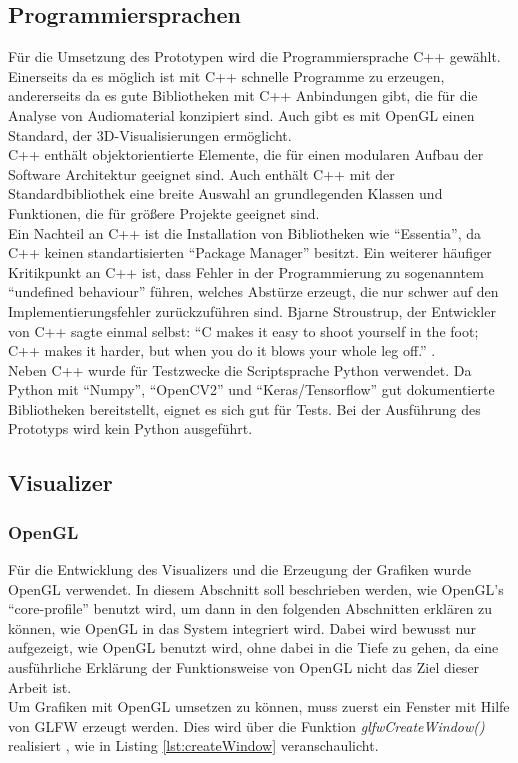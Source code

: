 \documentclass[11pt,a4paper]{article}
\begin{document}
\subsection{Programmiersprachen}
Für die Umsetzung des Prototypen wird die Programmiersprache C++ gewählt. Einerseits da es möglich ist mit C++ schnelle Programme zu erzeugen, andererseits da es gute Bibliotheken mit C++ Anbindungen gibt, die für die Analyse von Audiomaterial konzipiert sind. Auch gibt es mit OpenGL einen Standard, der 3D-Visualisierungen ermöglicht.\\
C++ enthält objektorientierte Elemente, die für einen modularen Aufbau der Software Architektur geeignet sind. Auch enthält C++ mit der Standardbibliothek eine breite Auswahl an grundlegenden Klassen und Funktionen, die für größere Projekte geeignet sind.\\
Ein Nachteil an C++ ist die Installation von Bibliotheken wie ``Essentia'', da C++ keinen standartisierten ``Package Manager'' besitzt. Ein weiterer häufiger Kritikpunkt an C++ ist, dass Fehler in der Programmierung zu sogenanntem ``undefined behaviour'' führen, welches Abstürze erzeugt, die nur schwer auf den Implementierungsfehler zurückzuführen sind. Bjarne Stroustrup, der Entwickler von C++ sagte einmal selbst: ``C makes it easy to shoot yourself in the foot; C++ makes it harder, but when you do it blows your whole leg off.'' \cite{BjarneStroustrupCite}.\\
Neben C++ wurde für Testzwecke die Scriptsprache Python verwendet. Da Python mit ``Numpy'', ``OpenCV2'' und ``Keras/Tensorflow'' gut dokumentierte Bibliotheken bereitstellt, eignet es sich gut für Tests. Bei der Ausführung des Prototyps wird kein Python ausgeführt.

\subsection{Visualizer}

\subsubsection{OpenGL}
Für die Entwicklung des Visualizers und die Erzeugung der Grafiken wurde OpenGL verwendet. In diesem Abschnitt soll beschrieben werden, wie OpenGL's ``core-profile'' benutzt wird, um dann in den folgenden Abschnitten erklären zu können, wie OpenGL in das System integriert wird. Dabei wird bewusst nur aufgezeigt, wie OpenGL benutzt wird, ohne dabei in die Tiefe zu gehen, da eine ausführliche Erklärung der Funktionsweise von OpenGL nicht das Ziel dieser Arbeit ist.\\
Um Grafiken mit OpenGL umsetzen zu können, muss zuerst ein Fenster mit Hilfe von GLFW erzeugt werden. Dies wird über die Funktion \mbox{\textit{glfwCreateWindow()}} realisiert \cite[Hello-Window]{LearnOpenGL}, wie in Listing \ref{lst:createWindow} veranschaulicht.
\end{document}
